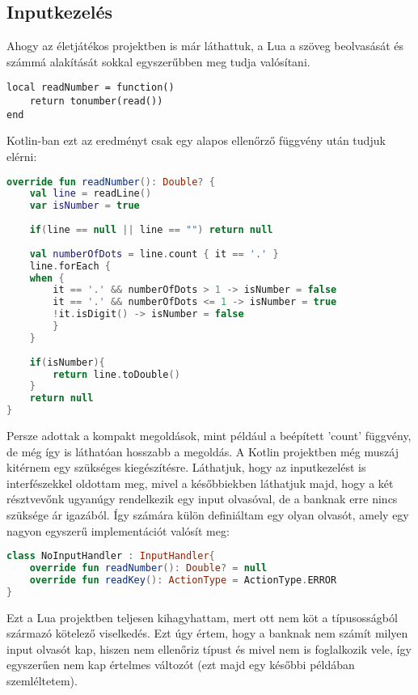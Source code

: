 \subsection{Inputkezelés}
Ahogy az életjátékos projektben is már láthattuk, a Lua a szöveg beolvasását és számmá alakítását sokkal egyszerűbben meg tudja valósítani. 
\scriptsize
\begin{lstlisting}[style=Lua]
local readNumber = function()
	return tonumber(read())
end
\end{lstlisting}
\normalsize
Kotlin-ban ezt az eredményt csak egy alapos ellenőrző függvény után tudjuk elérni:
\scriptsize
\begin{lstlisting}[language = Kotlin]
override fun readNumber(): Double? {
	val line = readLine()
	var isNumber = true
	
	if(line == null || line == "") return null
	
	val numberOfDots = line.count { it == '.' }
	line.forEach {
	when {
		it == '.' && numberOfDots > 1 -> isNumber = false
		it == '.' && numberOfDots <= 1 -> isNumber = true
		!it.isDigit() -> isNumber = false
		}
	}
	
	if(isNumber){
		return line.toDouble()
	}
	return null
}
\end{lstlisting}
\normalsize
Persze adottak a kompakt megoldások, mint például a beépített 'count' függvény, de még így is láthatóan hosszabb a megoldás. A Kotlin projektben még muszáj kitérnem egy szükséges kiegészítésre. Láthatjuk, hogy az inputkezelést is interfészekkel oldottam meg, mivel a későbbiekben láthatjuk majd, hogy a két résztvevőnk ugyanúgy rendelkezik egy input olvasóval, de a banknak erre nincs szüksége ár igazából. Így számára külön definiáltam egy olyan olvasót, amely egy nagyon egyszerű implementációt valósít meg:
\scriptsize
\begin{lstlisting}[language = Kotlin]
class NoInputHandler : InputHandler{
	override fun readNumber(): Double? = null
	override fun readKey(): ActionType = ActionType.ERROR
}
\end{lstlisting}
\normalsize
Ezt a Lua projektben teljesen kihagyhattam, mert ott nem köt a típusosságból származó kötelező viselkedés. Ezt úgy értem, hogy a banknak nem számít milyen input olvasót kap, hiszen nem ellenőriz típust és mivel nem is foglalkozik vele, így egyszerűen nem kap értelmes változót (ezt majd egy későbbi példában szemléltetem).

\newpage

